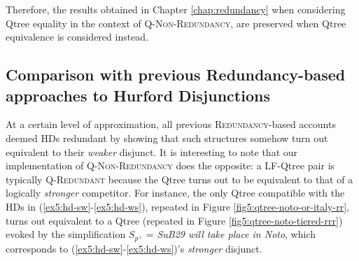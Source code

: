 \begin{exe}
	\label{ex5:qtree-equality-equivalence}
	\label{ex5:qtree-equality-equivalence-proof}
\end{exe}

Therefore, the results obtained in Chapter \ref{chap:redundancy} when considering Qtree equality in the context of \textsc{Q-Non-Redundancy}, are preserved when Qtree equivalence is considered instead.

\subsection{Comparison with previous Redundancy-based approaches to Hurford Disjunctions}

At a certain level of approximation, all previous \textsc{Redundancy}-based accounts deemed HDs redundant by showing that such structures somehow turn out equivalent to their \textit{weaker} disjunct. It is interesting to note that our implementation of \textsc{Q-Non-Redundancy} does the opposite: a LF-Qtree pair is typically \textsc{Q-Redundant} because the Qtree turns out to be equivalent to that of a logically \textit{stronger} competitor. For instance, the only Qtree compatible with the HDs in (\ref{ex5:hd-sw}-\ref{ex5:hd-ws}), repeated in Figure \ref{fig5:qtree-noto-or-italy-rr}, turns out equivalent to a Qtree (repeated in Figure \ref{fig5:qtree-noto-tiered-rrr}) evoked by the simplification $S_{p^+}$ = \textit{SuB29 will take place in Noto}, which corresponds to (\ref{ex5:hd-sw}-\ref{ex5:hd-ws})'s \textit{stronger} disjunct.

